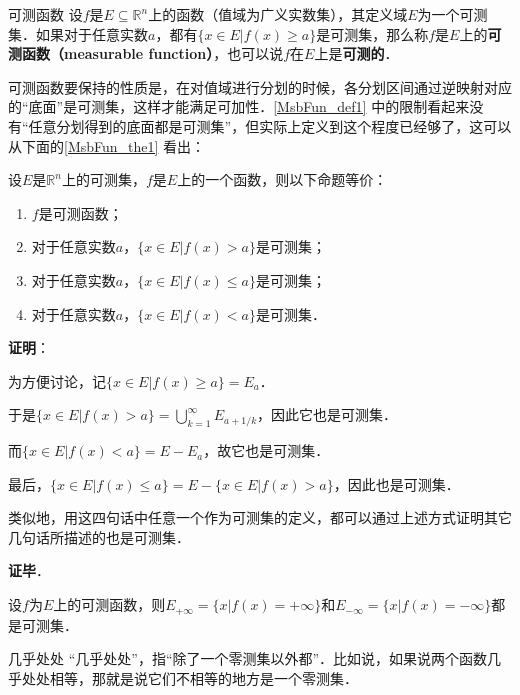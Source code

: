 \begin{definition}{可测函数}\label{MsbFun_def1}
设$f$是$E\subseteq\mathbb{R}^n$上的函数（值域为广义实数集），其定义域$E$为一个可测集．如果对于任意实数$a$，都有$\{x\in E|f(x)\geq a\}$是可测集，那么称$f$是$E$上的\textbf{可测函数（measurable function）}，也可以说$f$在$E$上是\textbf{可测的}．
\end{definition}


可测函数要保持的性质是，在对值域进行分划的时候，各分划区间通过逆映射对应的“底面”是可测集，这样才能满足可加性．\autoref{MsbFun_def1} 中的限制看起来没有“任意分划得到的底面都是可测集”，但实际上定义到这个程度已经够了，这可以从下面的\autoref{MsbFun_the1} 看出：


\begin{theorem}{}\label{MsbFun_the1}
设$E$是$\mathbb{R}^n$上的可测集，$f$是$E$上的一个函数，则以下命题等价：
\begin{enumerate}
\item $f$是可测函数；
\item 对于任意实数$a$，$\{x\in E|f(x)>a\}$是可测集；
\item 对于任意实数$a$，$\{x\in E|f(x)\leq a\}$是可测集；
\item 对于任意实数$a$，$\{x\in E|f(x)<a\}$是可测集．
\end{enumerate}
\end{theorem}

\textbf{证明}：

为方便讨论，记$\{x\in E|f(x)\geq a\}=E_a$．

于是$\{x\in E|f(x)>a\}=\bigcup_{k=1}^\infty E_{a+1/k}$，因此它也是可测集．

而$\{x\in E|f(x)<a\}=E-E_a$，故它也是可测集．

最后，$\{x\in E|f(x)\leq a\}=E-\{x\in E|f(x)>a\}$，因此也是可测集．

类似地，用这四句话中任意一个作为可测集的定义，都可以通过上述方式证明其它几句话所描述的也是可测集．

\textbf{证毕}．





\begin{corollary}{}
设$f$为$E$上的可测函数，则$E_{+\infty}=\{x|f(x)=+\infty\}$和$E_{-\infty}=\{x|f(x)=-\infty\}$都是可测集．
\end{corollary}



\begin{definition}{几乎处处}
“几乎处处”，指“除了一个零测集以外都”．比如说，如果说两个函数几乎处处相等，那就是说它们不相等的地方是一个零测集．
\end{definition}

